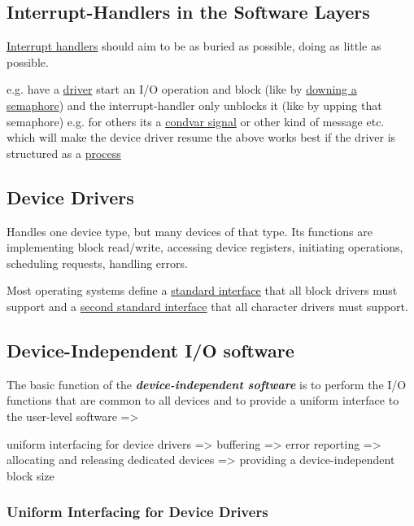 \subsection*{Interrupt-Handlers in the Software Layers}

\ul{Interrupt handlers} should aim to be as buried as possible, doing as little
as possible.

\begin{itemize}

    \vItem
          e.g. have a \ul{driver} start an I/O
          operation and block (like by \ul{downing a semaphore}) and the
          interrupt-handler only unblocks it (like by upping that semaphore)
    \vItem
          e.g. for others its a \ul{condvar signal} or other kind of message etc. which will make the device
          driver resume
    \vItem
          the above works best if the driver is structured as a \ul{process}
\end{itemize}

\subsection*{Device Drivers}

Handles one device type, but many devices of that type. 
Its functions are implementing block read/write, accessing
device registers, initiating operations, scheduling requests,
handling errors.

Most operating systems define a \ul{standard interface} that all block drivers must support and a
\ul{second standard interface} that all character drivers must support.


\subsection*{Device-Independent I/O software}

The basic function of the \textbf{ \textit{device-independent software}} is
to perform the I/O functions that are common to all devices and to
provide a uniform interface to the user-level software =>

uniform interfacing for device drivers => buffering => error reporting =>
allocating and releasing dedicated devices => providing a device-independent block size

\subsubsection*{Uniform Interfacing for Device Drivers}

